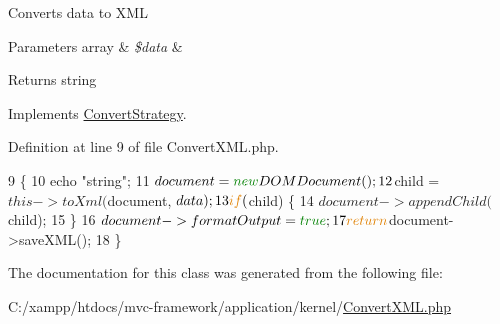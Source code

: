 Converts data to X\+ML


\begin{DoxyParams}[1]{Parameters}
array & {\em \$data} & \\
\hline
\end{DoxyParams}
\begin{DoxyReturn}{Returns}
string 
\end{DoxyReturn}


Implements \hyperlink{interface_convert_strategy_a41444ea294bbd35a6c07ef4e9faeae10}{Convert\+Strategy}.



Definition at line 9 of file Convert\+X\+M\+L.\+php.


\begin{DoxyCode}
9                                    \{
10         echo \textcolor{stringliteral}{"string"};
11         $document = \textcolor{keyword}{new} DOMDocument();
12         $child = $this->toXml($document, $data);
13         \textcolor{keywordflow}{if} ($child) \{
14             $document->appendChild($child);
15         \}
16         $document->formatOutput = \textcolor{keyword}{true};
17         \textcolor{keywordflow}{return} $document->saveXML();
18     \}
\end{DoxyCode}


The documentation for this class was generated from the following file\+:\begin{DoxyCompactItemize}
\item 
C\+:/xampp/htdocs/mvc-\/framework/application/kernel/\hyperlink{_convert_x_m_l_8php}{Convert\+X\+M\+L.\+php}\end{DoxyCompactItemize}
